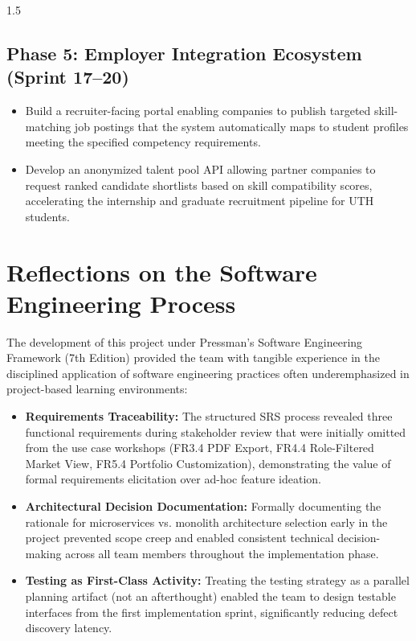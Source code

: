 \documentclass[12pt,a4paper]{report}
\begin{document}
\begin{spacing}{1.5}
		\subsection{Phase 5: Employer Integration Ecosystem (Sprint 17--20)}
		
		\begin{itemize}
			\item Build a recruiter-facing portal enabling companies to publish targeted skill-matching job postings that the system automatically maps to student profiles meeting the specified competency requirements.
			\item Develop an anonymized talent pool API allowing partner companies to request ranked candidate shortlists based on skill compatibility scores, accelerating the internship and graduate recruitment pipeline for UTH students.
		\end{itemize}
		
		\section{Reflections on the Software Engineering Process}
		
		The development of this project under Pressman's Software Engineering Framework (7th Edition) provided the team with tangible experience in the disciplined application of software engineering practices often underemphasized in project-based learning environments:
		
		\begin{itemize}
			\item \textbf{Requirements Traceability:} The structured SRS process revealed three functional requirements during stakeholder review that were initially omitted from the use case workshops (FR3.4 PDF Export, FR4.4 Role-Filtered Market View, FR5.4 Portfolio Customization), demonstrating the value of formal requirements elicitation over ad-hoc feature ideation.
			\item \textbf{Architectural Decision Documentation:} Formally documenting the rationale for microservices vs. monolith architecture selection early in the project prevented scope creep and enabled consistent technical decision-making across all team members throughout the implementation phase.
			\item \textbf{Testing as First-Class Activity:} Treating the testing strategy as a parallel planning artifact (not an afterthought) enabled the team to design testable interfaces from the first implementation sprint, significantly reducing defect discovery latency.
		\end{itemize}
		

\end{spacing}
\end{document}
